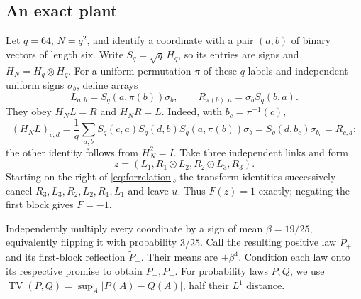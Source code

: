 \documentclass[11pt]{article}
\newcommand{\TV}{\operatorname{TV}}
\newcommand{\1}{\mathbf 1}
\begin{document}
\subsection{An exact plant}
Let $q=64$, $N=q^2$, and identify a coordinate with a pair $(a,b)$ of
binary vectors of length six. Write $S_q=\sqrt q\,H_q$, so its entries
are signs and $H_N=H_q\otimes H_q$.
For a uniform permutation $\pi$ of these $q$ labels and independent
uniform signs $\sigma_b$, define arrays
\begin{equation}\label{eq:finite-link}
 L_{a,b}=S_q(a,\pi(b))\sigma_b,\qquad
 R_{\pi(b),a}=\sigma_bS_q(b,a).
\end{equation}
They obey $H_NL=R$ and $H_NR=L$. Indeed, with $b_c=\pi^{-1}(c)$,
\[
 (H_NL)_{c,d}
 =\frac1q\sum_{a,b}S_q(c,a)S_q(d,b)S_q(a,\pi(b))\sigma_b
 =S_q(d,b_c)\sigma_{b_c}=R_{c,d};
\]
the other identity follows from $H_N^2=I$.
Take three independent links and form
\begin{equation}\label{eq:plant}
                z=(L_1,R_1\odot L_2,R_2\odot L_3,R_3).
\end{equation}
Starting on the right of \eqref{eq:forrelation}, the transform identities
successively cancel $R_3,L_3,R_2,L_2,R_1,L_1$ and leave $u$.
Thus $F(z)=1$ exactly; negating the first block gives $F=-1$.

Independently multiply every coordinate by a sign of mean $\beta=19/25$,
equivalently flipping it with probability $3/25$.
Call the resulting positive law $\widetilde P_+$ and its first-block
reflection $\widetilde P_-$. Their means are $\pm\beta^4$.
Condition each law onto its respective promise to obtain $P_+,P_-$.
For probability laws $P,Q$, we use
$\TV(P,Q)=\sup_A|P(A)-Q(A)|$, half their $L^1$ distance.
\end{document}
